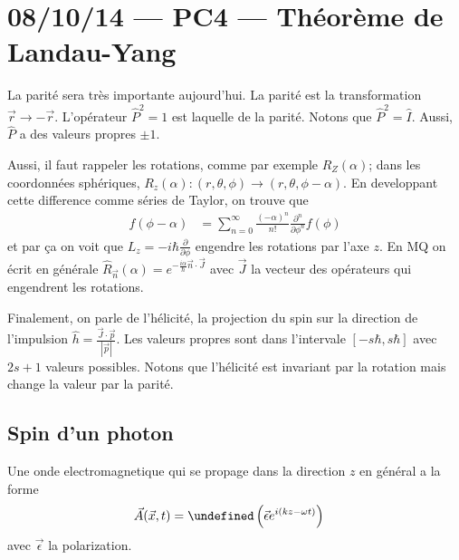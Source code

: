 \documentclass[10pt]{report}
\newcommand{\pd}[2]{\frac{\partial #1}{\partial#2}}
\newcommand{\abs}[1]{\left|#1\right|}
\let\Re\undefined
\DeclareMathOperator{\Re}{Re}
\begin{document}
\chapter{08/10/14 --- PC4 --- Th\'eor\`eme de Landau-Yang}

La parit\'e sera tr\`es importante aujourd'hui. La parit\'e est la transformation $\vec{r} \to -\vec{r}$. L'op\'erateur $\hat{P}^2 = 1$ est laquelle de la parit\'e. Notons que $\hat{P}^2 = \hat{I}$. Aussi, $\hat{P}$ a des valeurs propres $\pm 1$. 

Aussi, il faut rappeler les rotations, comme par exemple $R_Z(\alpha)$; dans les coordonn\'ees sph\'eriques, $R_z(\alpha): (r,\theta,\phi) \to (r,\theta,\phi - \alpha)$. En developpant cette difference comme s\'eries de Taylor, on trouve que
\begin{align}
    f(\phi-\alpha) &= \sum\limits_{n=0}^{\infty} \frac{(-\alpha)^n}{n!}\frac{\partial^n}{\partial \phi^n} f(\phi)
\end{align}
et par \c{c}a on voit que $L_z = -i\hbar \pd{}{\phi}$ engendre les rotations par l'axe $z$. En MQ on \'ecrit en g\'en\'erale $\hat{R}_{\vec{n}}(\alpha) = e^{-\frac{i\alpha}{\hbar}\vec{n} \cdot \vec{J}}$ avec $\vec{J}$ la vecteur des op\'erateurs qui engendrent les rotations.

Finalement, on parle de l'h\'elicit\'e, la projection du spin sur la direction de l'impulsion $\hat{h} = \frac{\vec{J} \cdot \vec{p}}{\abs{\vec{p}}}$. Les valeurs propres sont dans l'intervale $\left[ -s\hbar,s\hbar \right]$ avec $2s+1$ valeurs possibles. Notons que l'h\'elicit\'e est invariant par la rotation mais change la valeur par la parit\'e.

\section{Spin d'un photon}

Une onde electromagnetique qui se propage dans la direction $z$ en g\'en\'eral a la forme
\begin{align}
    \vec{A}(\vec{x},t) &= \Re\left( \vec{\epsilon}e^{i(kz- \omega t)} \right)
\end{align}
avec $\vec{\epsilon}$ la polarization.
\end{document}
